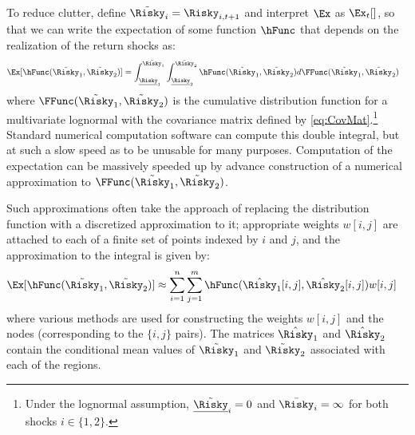 To reduce clutter, define $\tilde{\Risky}_{i}=\Risky_{i,t+1}$ and interpret $\Ex$ as $\Ex_{t}[]$, so that we can write the expectation of some function $\hFunc$ that depends on the realization of
the return shocks as:
\begin{equation}\begin{gathered}\begin{aligned}
  \Ex[\hFunc(\tilde{\Risky}_{1},\tilde{\Risky}_{2})] & =  \int_{\underline{{\Risky}}_{1}}^{\bar{\Risky}_{1}}\int_{\underline{\Risky}_{2}}^{\bar{\Risky}_{2}} \hFunc(\tilde{\Risky}_{1},\tilde{\Risky}_{2}) d\FFunc(\tilde{\Risky}_{1},\tilde{\Risky}_{2})
\end{aligned}\end{gathered}\end{equation}
where $\FFunc(\tilde{\Risky}_{1},\tilde{\Risky}_{2})$ is the cumulative distribution
function for a multivariate lognormal with the covariance matrix defined by \eqref{eq:CovMat}.\footnote{Under the lognormal assumption, $\underline{\tilde{\Risky}}_{i}=0$ and $\bar{\Risky}_{i}=\infty$ for both shocks $i \in \{1,2\}$.}  Standard numerical computation software can compute this
double integral, but at such a slow speed as to be unusable for many purposes.
Computation of the expectation can be massively speeded up by
advance construction of a numerical approximation to
$\FFunc(\tilde{\Risky}_{1},\tilde{\Risky}_{2})$.

Such approximations often take the approach of replacing the distribution function
with a discretized approximation to it; appropriate weights $w[i,j]$ are attached to
each of a finite set of points indexed by $i$ and $j$, and
the approximation to the integral is given by:
\begin{equation}\begin{gathered}\begin{aligned}
  \Ex[\hFunc(\tilde{\Risky}_{1},\tilde{\Risky}_{2})] & \approx  \sum_{i=1}^{n}\sum_{j=1}^{m} \hFunc(\hat{\Risky}_{1}[i,j],\hat{\Risky}_{2}[i,j])w[i,j]  \label{eq:wtdAvg}
\end{aligned}\end{gathered}\end{equation}
where various methods are used for constructing the weights $w[i,j]$ and the nodes (corresponding to the $\{i,j\}$ pairs).  The matrices $\hat{\Risky}_{1}$ and $\hat{\Risky}_{2}$ contain the conditional mean values of $\tilde{\Risky}_{1}$ and $\tilde{\Risky}_{2}$ associated with each of the regions.

